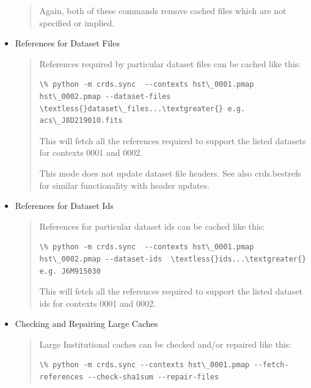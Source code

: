 \documentclass[letterpaper,10pt,english]{sphinxmanual}
\begin{document}
\begin{itemize}
\begin{quote}
Again, both of these commands remove cached files which are not specified or implied.
\end{quote}

\item {} 
References for Dataset Files
\begin{quote}

References required by particular dataset files can be cached like this:

\begin{Verbatim}[commandchars=\\\{\}]
\% python -m crds.sync  --contexts hst\_0001.pmap hst\_0002.pmap --dataset-files  \textless{}dataset\_files...\textgreater{} e.g. acs\_J8D219010.fits
\end{Verbatim}

This will fetch all the references required to support the listed datasets for contexts 0001 and 0002.

This mode does not update dataset file headers.  See also crds.bestrefs for similar functionality with header updates.
\end{quote}

\item {} 
References for Dataset Ids
\begin{quote}

References for particular dataset ids can be cached like this:

\begin{Verbatim}[commandchars=\\\{\}]
\% python -m crds.sync  --contexts hst\_0001.pmap hst\_0002.pmap --dataset-ids  \textless{}ids...\textgreater{}  e.g. J6M915030
\end{Verbatim}

This will fetch all the references required to support the listed dataset ids for contexts 0001 and 0002.
\end{quote}

\item {} 
Checking and Repairing Large Caches
\begin{quote}

Large Institutional caches can be checked and/or repaired like this:

\begin{Verbatim}[commandchars=\\\{\}]
\% python -m crds.sync --contexts hst\_0001.pmap --fetch-references --check-sha1sum --repair-files
\end{Verbatim}


\end{quote}
\end{itemize}
\end{document}
